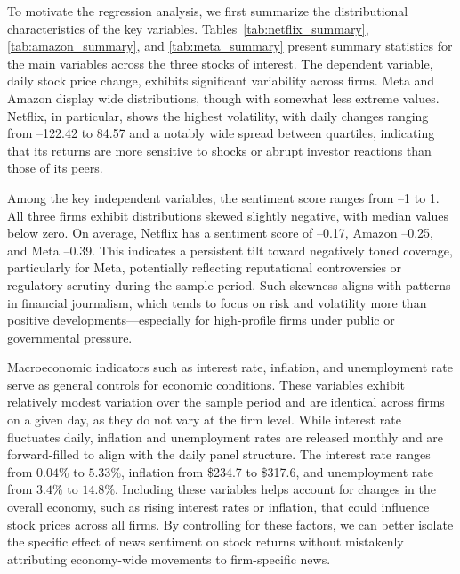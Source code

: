 \documentclass[12pt]{article}
\begin{document}
To motivate the regression analysis, we first summarize the distributional characteristics of the key variables. Tables~\ref{tab:netflix_summary}, \ref{tab:amazon_summary}, and \ref{tab:meta_summary} present summary statistics for the main variables across the three stocks of interest. The dependent variable, daily stock price change, exhibits significant variability across firms. Meta and Amazon display wide distributions, though with somewhat less extreme values. Netflix, in particular, shows the highest volatility, with daily changes ranging from –122.42 to 84.57 and a notably wide spread between quartiles, indicating that its returns are more sensitive to shocks or abrupt investor reactions than those of its peers.

Among the key independent variables, the sentiment score ranges from –1 to 1. All three firms exhibit distributions skewed slightly negative, with median values below zero. On average, Netflix has a sentiment score of –0.17, Amazon –0.25, and Meta –0.39. This indicates a persistent tilt toward negatively toned coverage, particularly for Meta, potentially reflecting reputational controversies or regulatory scrutiny during the sample period. Such skewness aligns with patterns in financial journalism, which tends to focus on risk and volatility more than positive developments—especially for high-profile firms under public or governmental pressure.

Macroeconomic indicators such as interest rate, inflation, and unemployment rate serve as general controls for economic conditions. These variables exhibit relatively modest variation over the sample period and are identical across firms on a given day, as they do not vary at the firm level. While interest rate fluctuates daily, inflation and unemployment rates are released monthly and are forward-filled to align with the daily panel structure. The interest rate ranges from $0.04\%$ to $5.33\%$, inflation from \$234.7 to \$317.6, and unemployment rate from $3.4\%$ to $14.8\%$. Including these variables helps account for changes in the overall economy, such as rising interest rates or inflation, that could influence stock prices across all firms. By controlling for these factors, we can better isolate the specific effect of news sentiment on stock returns without mistakenly attributing economy-wide movements to firm-specific news.
\end{document}
